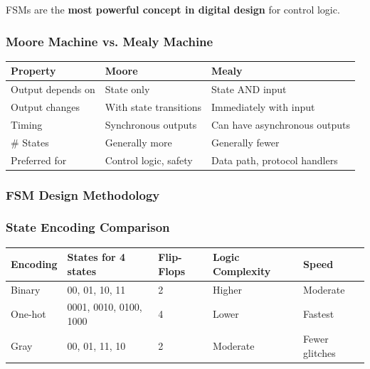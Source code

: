 \documentclass[11pt,a4paper]{book}
\begin{document}
FSMs are the \textbf{most powerful concept in digital design} for control logic.

\subsubsection{Moore Machine vs. Mealy Machine}

\begin{center}
\begin{tabular}{|l|l|l|}
\hline
Property & Moore & Mealy \\
\hline
Output depends on & State only & State AND input \\
Output changes & With state transitions & Immediately with input \\
Timing & Synchronous outputs & Can have asynchronous outputs \\
# States & Generally more & Generally fewer \\
Preferred for & Control logic, safety & Data path, protocol handlers \\
\hline
\end{tabular}
\end{center}

\subsubsection{FSM Design Methodology}

\subsubsection{State Encoding Comparison}

\begin{center}
\begin{tabular}{|l|l|l|l|l|}
\hline
Encoding & States for 4 states & Flip-Flops & Logic Complexity & Speed \\
\hline
Binary & 00, 01, 10, 11 & 2 & Higher & Moderate \\
One-hot & 0001, 0010, 0100, 1000 & 4 & Lower & Fastest \\
Gray & 00, 01, 11, 10 & 2 & Moderate & Fewer glitches \\
\hline
\end{tabular}
\end{center}
\end{document}
